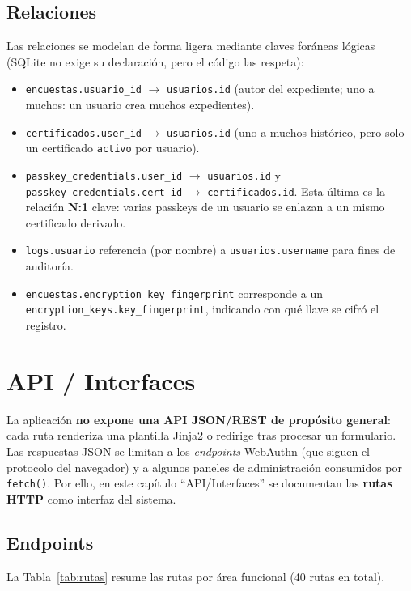 \documentclass[10pt,letterpaper]{report}
\begin{document}
\section{Relaciones}
Las relaciones se modelan de forma ligera mediante claves for\'aneas l\'ogicas (SQLite no exige su
declaraci\'on, pero el c\'odigo las respeta):
\begin{itemize}
  \item \texttt{encuestas.usuario\_id} $\rightarrow$ \texttt{usuarios.id} (autor del expediente; uno a
  muchos: un usuario crea muchos expedientes).
  \item \texttt{certificados.user\_id} $\rightarrow$ \texttt{usuarios.id} (uno a muchos hist\'orico,
  pero solo un certificado \texttt{activo} por usuario).
  \item \texttt{passkey\_credentials.user\_id} $\rightarrow$ \texttt{usuarios.id} y
  \texttt{passkey\_credentials.cert\_id} $\rightarrow$ \texttt{certificados.id}. Esta \'ultima es la
  relaci\'on \textbf{N:1} clave: varias passkeys de un usuario se enlazan a un mismo certificado
  derivado.
  \item \texttt{logs.usuario} referencia (por nombre) a \texttt{usuarios.username} para fines de
  auditor\'ia.
  \item \texttt{encuestas.encryption\_key\_fingerprint} corresponde a un
  \texttt{encryption\_keys.key\_fingerprint}, indicando con qu\'e llave se cifr\'o el registro.
\end{itemize}

\chapter{API / Interfaces}

La aplicaci\'on \textbf{no expone una API JSON/REST de prop\'osito general}: cada ruta renderiza una
plantilla Jinja2 o redirige tras procesar un formulario. Las respuestas JSON se limitan a los
\emph{endpoints} WebAuthn (que siguen el protocolo del navegador) y a algunos paneles de
administraci\'on consumidos por \texttt{fetch()}. Por ello, en este cap\'itulo ``API/Interfaces'' se
documentan las \textbf{rutas HTTP} como interfaz del sistema.

\section{Endpoints}
La Tabla~\ref{tab:rutas} resume las rutas por \'area funcional (40 rutas en total).
\end{document}

